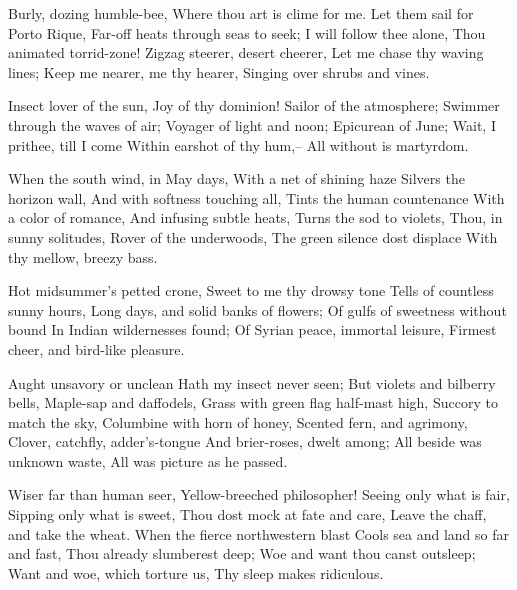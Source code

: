 Burly, dozing humble-bee,
Where thou art is clime for me.
Let them sail for Porto Rique,
Far-off heats through seas to seek;
I will follow thee alone,
Thou animated torrid-zone!
Zigzag steerer, desert cheerer,
Let me chase thy waving lines;
Keep me nearer, me thy hearer,
Singing over shrubs and vines.

Insect lover of the sun,
Joy of thy dominion!
Sailor of the atmosphere;
Swimmer through the waves of air;
Voyager of light and noon;
Epicurean of June;
Wait, I prithee, till I come
Within earshot of thy hum,--
All without is martyrdom.

When the south wind, in May days,
With a net of shining haze
Silvers the horizon wall,
And with softness touching all,
Tints the human countenance
With a color of romance,
And infusing subtle heats,
Turns the sod to violets,
Thou, in sunny solitudes,
Rover of the underwoods,
The green silence dost displace
With thy mellow, breezy bass.

Hot midsummer's petted crone,
Sweet to me thy drowsy tone
Tells of countless sunny hours,
Long days, and solid banks of flowers;
Of gulfs of sweetness without bound
In Indian wildernesses found;
Of Syrian peace, immortal leisure,
Firmest cheer, and bird-like pleasure.

Aught unsavory or unclean
Hath my insect never seen;
But violets and bilberry bells,
Maple-sap and daffodels,
Grass with green flag half-mast high,
Succory to match the sky,
Columbine with horn of honey,
Scented fern, and agrimony,
Clover, catchfly, adder's-tongue
And brier-roses, dwelt among;
All beside was unknown waste,
All was picture as he passed.

Wiser far than human seer,
Yellow-breeched philosopher!
Seeing only what is fair,
Sipping only what is sweet,
Thou dost mock at fate and care,
Leave the chaff, and take the wheat.
When the fierce northwestern blast
Cools sea and land so far and fast,
Thou already slumberest deep;
Woe and want thou canst outsleep;
Want and woe, which torture us,
Thy sleep makes ridiculous.
